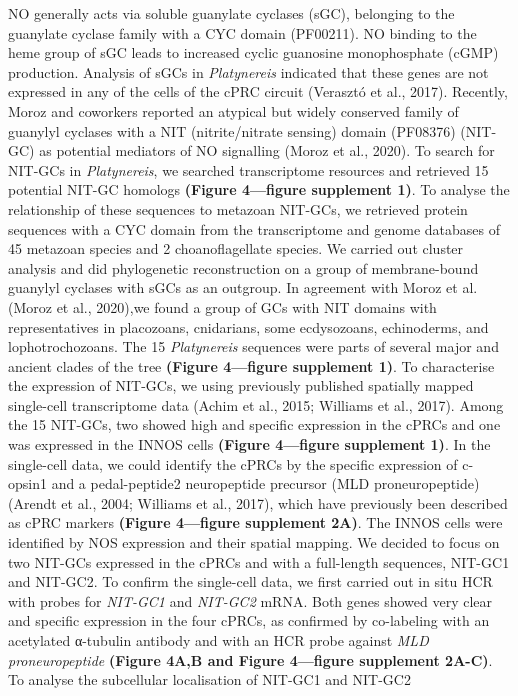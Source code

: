 \documentclass[
  10pt,
  onecolumn]{article}
\begin{document}
NO generally acts via soluble guanylate cyclases (sGC), belonging to the
guanylate cyclase family with a CYC domain (PF00211). NO binding to the
heme group of sGC leads to increased cyclic guanosine monophosphate
(cGMP) production. Analysis of sGCs in \emph{Platynereis} indicated that
these genes are not expressed in any of the cells of the cPRC circuit
(Verasztó et al., 2017). Recently, Moroz and coworkers reported an
atypical but widely conserved family of guanylyl cyclases with a NIT
(nitrite/nitrate sensing) domain (PF08376) (NIT-GC) as potential
mediators of NO signalling (Moroz et al., 2020). To search for NIT-GCs
in \emph{Platynereis}, we searched transcriptome resources and retrieved
15 potential NIT-GC homologs \textbf{(Figure 4---figure supplement 1)}.
To analyse the relationship of these sequences to metazoan NIT-GCs, we
retrieved protein sequences with a CYC domain from the transcriptome and
genome databases of 45 metazoan species and 2 choanoflagellate species.
We carried out cluster analysis and did phylogenetic reconstruction on a
group of membrane-bound guanylyl cyclases with sGCs as an outgroup. In
agreement with Moroz et al. (Moroz et al., 2020),we found a group of GCs
with NIT domains with representatives in placozoans, cnidarians, some
ecdysozoans, echinoderms, and lophotrochozoans. The 15
\emph{Platynereis} sequences were parts of several major and ancient
clades of the tree \textbf{(Figure 4---figure supplement 1)}. To
characterise the expression of NIT-GCs, we using previously published
spatially mapped single-cell transcriptome data (Achim et al., 2015;
Williams et al., 2017). Among the 15 NIT-GCs, two showed high and
specific expression in the cPRCs and one was expressed in the INNOS
cells \textbf{(Figure 4---figure supplement 1)}. In the single-cell
data, we could identify the cPRCs by the specific expression of c-opsin1
and a pedal-peptide2 neuropeptide precursor (MLD proneuropeptide)
(Arendt et al., 2004; Williams et al., 2017), which have previously been
described as cPRC markers \textbf{(Figure 4---figure supplement 2A)}.
The INNOS cells were identified by NOS expression and their spatial
mapping. We decided to focus on two NIT-GCs expressed in the cPRCs and
with a full-length sequences, NIT-GC1 and NIT-GC2. To confirm the
single-cell data, we first carried out in situ HCR with probes for
\emph{NIT-GC1} and \emph{NIT-GC2} mRNA. Both genes showed very clear and
specific expression in the four cPRCs, as confirmed by co-labeling with
an acetylated α-tubulin antibody and with an HCR probe against \emph{MLD
proneuropeptide} \textbf{(Figure 4A,B and Figure 4---figure supplement
2A-C)}. To analyse the subcellular localisation of NIT-GC1 and NIT-GC2
\end{document}
